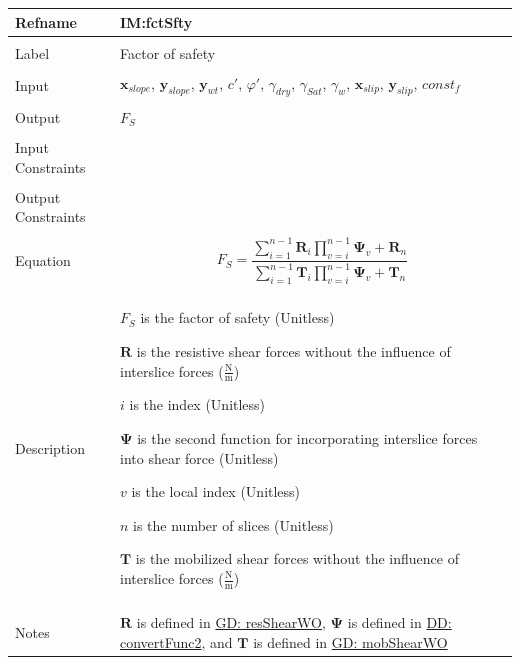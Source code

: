 \documentclass[12pt]{article}
\begin{document}
\vspace{\baselineskip}
\noindent
\begin{minipage}{\textwidth}
\begin{tabular}{>{\raggedright}p{}>{\raggedright\arraybackslash}p{}}
\toprule \textbf{Refname} & \textbf{IM:fctSfty}
\label{IM:fctSfty}
\\ \midrule \\
Label & Factor of safety
        
\\ \midrule \\
Input & ${\mathbf{x}_{slope}}$, ${\mathbf{y}_{slope}}$, ${\mathbf{y}_{wt}}$, $c'$, $φ'$, ${γ_{dry}}$, ${γ_{Sat}}$, ${γ_{w}}$, ${\mathbf{x}_{slip}}$, ${\mathbf{y}_{slip}}$, $const_f$
        
\\ \midrule \\
Output & ${F_{S}}$
         
\\ \midrule \\
Input Constraints & 
\\ \midrule \\
Output Constraints & 
\\ \midrule \\
Equation & \begin{displaymath}
           {F_{S}}=\frac{\displaystyle\sum_{i=1}^{n-1}{{\mathbf{R}}_{i} \displaystyle\prod_{v=i}^{n-1}{{\mathbf{Ψ}}_{v}}}+{\mathbf{R}}_{n}}{\displaystyle\sum_{i=1}^{n-1}{{\mathbf{T}}_{i} \displaystyle\prod_{v=i}^{n-1}{{\mathbf{Ψ}}_{v}}}+{\mathbf{T}}_{n}}
           \end{displaymath}
\\ \midrule \\
Description & \begin{symbDescription}
              \item{${F_{S}}$ is the factor of safety (Unitless)}
              \item{$\mathbf{R}$ is the resistive shear forces without the influence of interslice forces ($\frac{\text{N}}{\text{m}}$)}
              \item{$i$ is the index (Unitless)}
              \item{$\mathbf{Ψ}$ is the second function for incorporating interslice forces into shear force (Unitless)}
              \item{$v$ is the local index (Unitless)}
              \item{$n$ is the number of slices (Unitless)}
              \item{$\mathbf{T}$ is the mobilized shear forces without the influence of interslice forces ($\frac{\text{N}}{\text{m}}$)}
              \end{symbDescription}
\\ \midrule \\
Notes & $\mathbf{R}$ is defined in \hyperref[GD:resShearWO]{GD: resShearWO}, $\mathbf{Ψ}$ is defined in \hyperref[DD:convertFunc2]{DD: convertFunc2}, and $\mathbf{T}$ is defined in \hyperref[GD:mobShearWO]{GD: mobShearWO}
        

\end{tabular}
\end{minipage}
\end{document}
